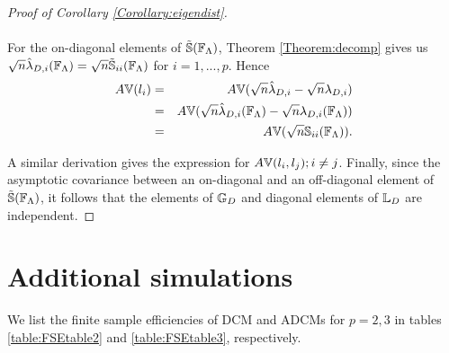 \begin{proof}[Proof of Corollary \ref{Corollary:eigendist}]
\paragraph{}For the on-diagonal elements of $\tilde {{\mathbb{S}}}({\mathbb{F}}_\Lambda)$, Theorem \ref{Theorem:decomp} gives us $ \sqrt n \hat\lambda_{D,i} ( {\mathbb{F}}_\Lambda) = \sqrt n \tilde {{\mathbb{S}}}_{ii}({\mathbb{F}}_\Lambda)$ for $i = 1,...,p$. Hence
%
\begin{eqnarray*}
A{\mathbb{V}}(l_i) &=& A{\mathbb{V}}(\sqrt n \hat\lambda_{D,i} - \sqrt n \lambda_{D,i})\\
&=& A{\mathbb{V}}(\sqrt n \hat\lambda_{D,i} ({\mathbb{F}}_\Lambda) - \sqrt n \lambda_{D,i}({\mathbb{F}}_\Lambda))\\
&=& A{\mathbb{V}}(\sqrt n {\mathbb{S}}_{ii}({\mathbb{F}}_\Lambda)).
\end{eqnarray*}

A similar derivation gives the expression for $A{\mathbb{V}}(l_i,l_j); i \neq j$. Finally, since the asymptotic covariance between an on-diagonal and an off-diagonal element of $\tilde {{\mathbb{S}}}( {\mathbb{F}}_\Lambda)$, it follows that the elements of ${\mathbb{G}}_D$ and diagonal elements of ${\mathbb{L}}_D$ are independent.
\end{proof}

\section{Additional simulations}
\label{sec:appD}
We list the finite sample efficiencies of DCM and ADCMs for $p=2,3$ in tables \ref{table:FSEtable2} and \ref{table:FSEtable3}, respectively.

